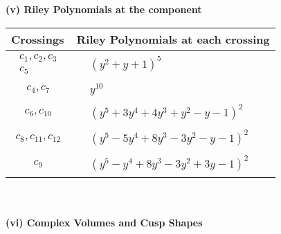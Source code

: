 \documentclass[1p]{elsarticle_modified}
\theoremstyle{definition}
\begin{document}
\newpage\renewcommand{\arraystretch}{1}
\flushleft \textbf{(v) Riley Polynomials at the component}\newline \\
\begin{tabular}{m{50pt}|m{274pt}}
Crossings & \hspace{64pt}Riley Polynomials at each crossing \\
\hline $$\begin{aligned}c_{1},c_{2},c_{3}\\c_{5}\end{aligned}$$&$\begin{aligned}
&(y^2+y+1)^5
\end{aligned}$\\
\hline $$\begin{aligned}c_{4},c_{7}\end{aligned}$$&$\begin{aligned}
&y^{10}
\end{aligned}$\\
\hline $$\begin{aligned}c_{6},c_{10}\end{aligned}$$&$\begin{aligned}
&(y^5+3 y^4+4 y^3+y^2- y-1)^2
\end{aligned}$\\
\hline $$\begin{aligned}c_{8},c_{11},c_{12}\end{aligned}$$&$\begin{aligned}
&(y^5-5 y^4+8 y^3-3 y^2- y-1)^2
\end{aligned}$\\
\hline $$\begin{aligned}c_{9}\end{aligned}$$&$\begin{aligned}
&(y^5- y^4+8 y^3-3 y^2+3 y-1)^2
\end{aligned}$\\
\hline
\end{tabular}\\~\\
\newpage\flushleft \textbf{(vi) Complex Volumes and Cusp Shapes}
\end{document}
